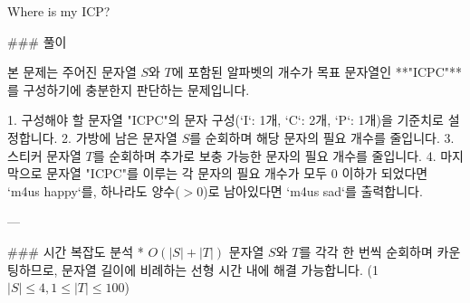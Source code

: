 \begin{tutorial}{Where is my ICP?}

### 풀이

본 문제는 주어진 문자열 $S$와 $T$에 포함된 알파벳의 개수가 목표 문자열인 **"ICPC"**를 구성하기에 충분한지 판단하는 문제입니다.

1. 구성해야 할 문자열 "ICPC"의 문자 구성(`I`: 1개, `C`: 2개, `P`: 1개)을 기준치로 설정합니다.
2. 가방에 남은 문자열 $S$를 순회하며 해당 문자의 필요 개수를 줄입니다.
3. 스티커 문자열 $T$를 순회하며 추가로 보충 가능한 문자의 필요 개수를 줄입니다.
4. 마지막으로 문자열 "ICPC"를 이루는 각 문자의 필요 개수가 모두 $0$ 이하가 되었다면 `m4us happy`를, 하나라도 양수($>0$)로 남아있다면  `m4us sad`를 출력합니다.

---

### 시간 복잡도 분석
* $O(|S| + |T|)$  
  문자열 $S$와 $T$를 각각 한 번씩 순회하며 카운팅하므로, 문자열 길이에 비례하는 선형 시간 내에 해결 가능합니다. (1 \le $|S| \le 4, 1 \le |T| \le 100$)


\end{tutorial}

